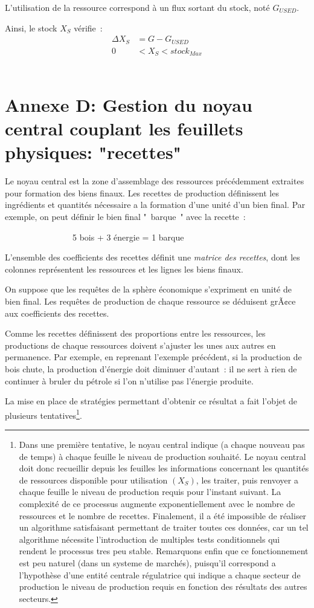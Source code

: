\documentclass[12pt,a4paper]{article}%
\begin{document}
L'utilisation de la ressource correspond à un flux sortant du stock, noté
$G_{USED}$.

Ainsi, le stock $X_{S}$ vérifie~:\ \ \ \ \ \ \ \ \ \ \ \ \ \ \ \ \ \ \ \
\begin{align*}
\Delta X_{S}  &  =G-G_{USED}\\
0  &  <X_{S}<stock_{Max}%
\end{align*}
\ \ \ \ 

\section{Annexe D: Gestion du noyau central couplant les feuillets physiques:
"recettes"}

Le noyau central est la zone d'assemblage des ressources précédemment
extraites pour formation des biens finaux. Les recettes de production
définissent les ingrédients et quantités nécessaire a la formation d'une unité
d'un bien final. Par exemple, on peut définir le bien final "~barque~" avec la recette~:

\ \ \ \ \ \ \ \ \ \ \ \ \ \ \ \ 5 bois + 3 énergie = 1 barque

L'ensemble des coefficients des recettes définit une \textit{matrice des
recettes}, dont les colonnes représentent les ressources et les lignes les
biens finaux.

On suppose que les requêtes de la sphère économique s'expriment en unité
de bien final. Les requêtes de production de chaque ressource se déduisent
grÃ¢ce aux coefficients des recettes.

Comme les recettes définissent des proportions entre les ressources, les
productions de chaque ressources doivent s'ajuster les unes aux autres en
permanence. Par exemple, en reprenant l'exemple précédent, si la production de
bois chute, la production d'énergie doit diminuer d'autant~: il ne sert à
rien de continuer à bruler du pétrole si l'on n'utilise pas l'énergie produite.

La mise en place de stratégies permettant d'obtenir ce résultat a fait l'objet
de plusieurs tentatives\footnote{Dans une première tentative, le noyau central
indique (a chaque nouveau pas de temps) à chaque feuille le niveau de
production souhaité. Le noyau central doit donc recueillir depuis les feuilles
les informations concernant les quantités de ressources disponible pour
utilisation $(X_{S})$, les traiter, puis renvoyer a chaque feuille le niveau
de production requis pour l'instant suivant. La complexité de ce processus
augmente exponentiellement avec le nombre de ressources et le nombre de
recettes. Finalement, il a été impossible de réaliser un algorithme
satisfaisant permettant de traiter toutes ces données, car un tel algorithme
nécessite l'introduction de multiples tests conditionnels qui rendent le
processus tres peu stable. Remarquons enfin que ce fonctionnement est peu
naturel (dans un systeme de marchés), puisqu'il correspond a l'hypothèse d'une
entité centrale régulatrice qui indique a chaque secteur de production le
niveau de production requis en fonction des résultats des autres secteurs.}.
\end{document}
